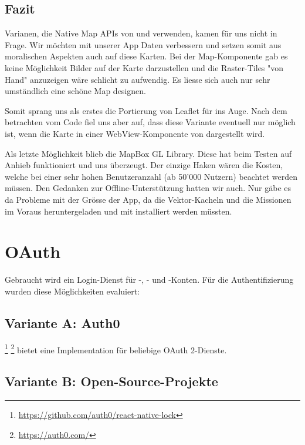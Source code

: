 \subsection{Fazit}

Varianen, die Native Map APIs von  und  verwenden, kamen für uns nicht in Frage.
Wir möchten mit unserer App  Daten verbessern und setzen somit aus moralischen Aspekten auch auf diese Karten.
Bei der  Map-Komponente gab es keine Möglichkeit Bilder auf der Karte darzustellen und die Raster-Tiles "von Hand" anzuzeigen wäre schlicht zu aufwendig. 
Es liesse sich auch nur sehr umständlich eine schöne Map designen.

Somit sprang uns als erstes die Portierung von Leaflet für  ins Auge. 
Nach dem betrachten vom Code fiel uns aber auf, dass diese Variante eventuell nur möglich ist, wenn die Karte in einer WebView-Komponente von  dargestellt wird.

Als letzte Möglichkeit blieb die MapBox GL Library.
Diese hat beim Testen auf Anhieb funktioniert und uns überzeugt.
Der einzige Haken wären die Kosten, welche bei einer sehr hohen Benutzeranzahl (ab 50'000 Nutzern) beachtet werden müssen.
Den Gedanken zur Offline-Unterstützung hatten wir auch.
Nur gäbe es da Probleme mit der Grösse der App, da die Vektor-Kacheln und die Missionen im Voraus heruntergeladen und mit installiert werden müssten.

\section{OAuth}
Gebraucht wird ein Login-Dienst für -, - und -Konten. 
Für die Authentifizierung wurden diese Möglichkeiten evaluiert:

\subsection{Variante A: Auth0}

\footnote{\url{https://github.com/auth0/react-native-lock}} \footnote{\url{https://auth0.com/}} bietet eine Implementation für beliebige \gls{OAuth} 2-Dienste. 

\subsection{Variante B: Open-Source-Projekte}

